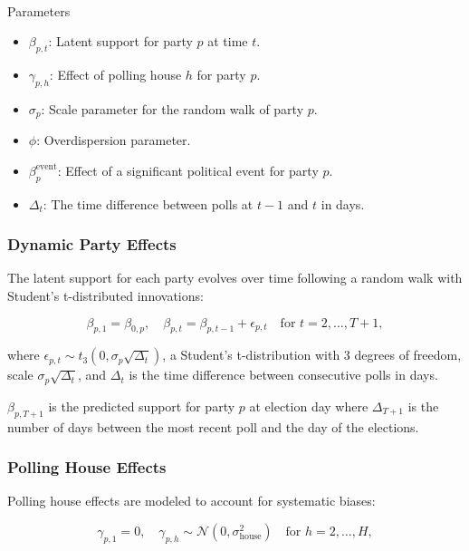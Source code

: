 \documentclass[
  letterpaper,
  DIV=11,
  numbers=noendperiod]{scrartcl}
\makeatletter
\let\oldparagraph\paragraph
\renewcommand{\paragraph}{
    \@ifstar
      \xxxParagraphStar
      \xxxParagraphNoStar
  }
\newcommand{\xxxParagraphStar}[1]{\oldparagraph*{#1}\mbox{}}
\newcommand{\xxxParagraphNoStar}[1]{\oldparagraph{#1}\mbox{}}
\providecommand{\tightlist}{%
  \setlength{\itemsep}{0pt}\setlength{\parskip}{0pt}}\usepackage{longtable,booktabs,array}
\makeatother
\begin{document}
\paragraph{Parameters}\label{parameters}

\begin{itemize}
\tightlist
\item
  \(\beta_{p,t}\): Latent support for party \(p\) at time \(t\).
\item
  \(\gamma_{p,h}\): Effect of polling house \(h\) for party \(p\).
\item
  \(\sigma_p\): Scale parameter for the random walk of party \(p\).
\item
  \(\phi\): Overdispersion parameter.
\item
  \(\beta^{\text{event}}_p\): Effect of a significant political event
  for party \(p\).
\item
  \(\Delta_t\): The time difference between polls at \(t-1\) and \(t\)
  in days.
\end{itemize}

\subsubsection{Dynamic Party Effects}\label{dynamic-party-effects}

The latent support for each party evolves over time following a random
walk with Student's t-distributed innovations:

\[
\beta_{p,1} = \beta_{0,p}, \quad \beta_{p,t} = \beta_{p,t-1} + \epsilon_{p,t} \quad \text{for } t = 2, \dots, T+1,
\]

where
\(\epsilon_{p,t} \sim t_3\left(0, \sigma_p \sqrt{\Delta_t}\right)\), a
Student's t-distribution with 3 degrees of freedom, scale
\(\sigma_p \sqrt{\Delta_t}\), and \(\Delta_t\) is the time difference
between consecutive polls in days.

\(\beta_{p, T + 1}\) is the predicted support for party \(p\) at
election day where \(\Delta_{T+1}\) is the number of days between the
most recent poll and the day of the elections.

\subsubsection{Polling House Effects}\label{polling-house-effects}

Polling house effects are modeled to account for systematic biases:

\[
\gamma_{p,1} = 0, \quad \gamma_{p,h} \sim \mathcal{N}\left(0, \sigma_{\text{house}}^2\right) \quad \text{for } h = 2, \dots, H,
\]
\end{document}
